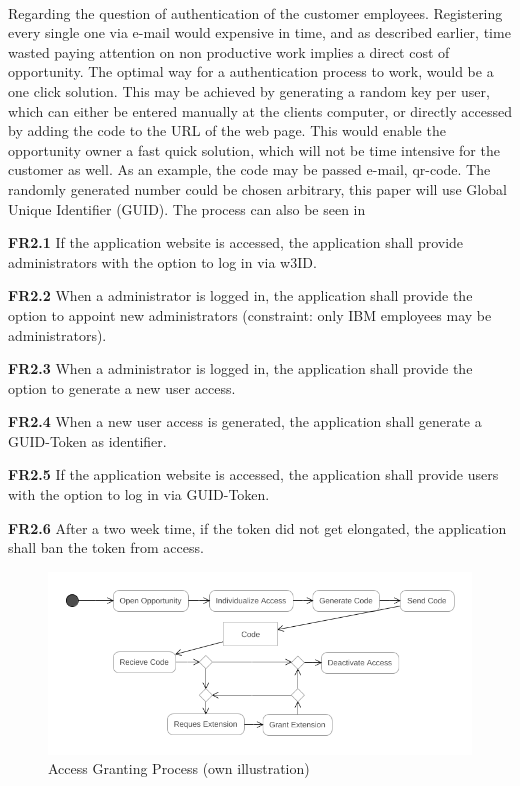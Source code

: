 \paragraph{}
Regarding the question of authentication of the customer employees. Registering every single one via e-mail would expensive in time, and as described earlier, time wasted paying attention on non productive work implies a direct cost of opportunity. The optimal way for a authentication process to work, would be a one click solution. This may be achieved by generating a random key per user, which can either be entered manually at the clients computer, or directly accessed by adding the code to the URL of the web page. This would enable the opportunity owner a fast quick solution, which will not be time intensive for the customer as well. As an example, the code may be passed e-mail, qr-code. The randomly generated number could be chosen arbitrary, this paper will use Global Unique Identifier (GUID). The process can also be seen in 
\begin{closeItem}
    \item [\textbf{FR2.1}] If the application website is accessed, the application shall provide administrators with the option to log in via w3ID.
    \item [\textbf{FR2.2}] When a administrator is logged in, the application shall provide the option to appoint new administrators (constraint: only IBM employees may be administrators).
    \item [\textbf{FR2.3}] When a administrator is logged in, the application shall provide the option to generate a new user access.
    \item [\textbf{FR2.4}] When a new user access is generated, the application shall generate a GUID-Token as identifier.
    \item [\textbf{FR2.5}] If the application website is accessed, the application shall provide users with the option to log in via GUID-Token.
    \item [\textbf{FR2.6}] After a two week time, if the token did not get elongated, the application shall ban the token from access.
\end{closeItem}

\begin{figure}[H]
    \centering
    \includegraphics[width=\textwidth]{img/diagrams/Activity/AccessGranting.png}
    \caption[Access Granting Process]{Access Granting Process (own illustration)}
    \label{fig:functionalaccess}
\end{figure}

